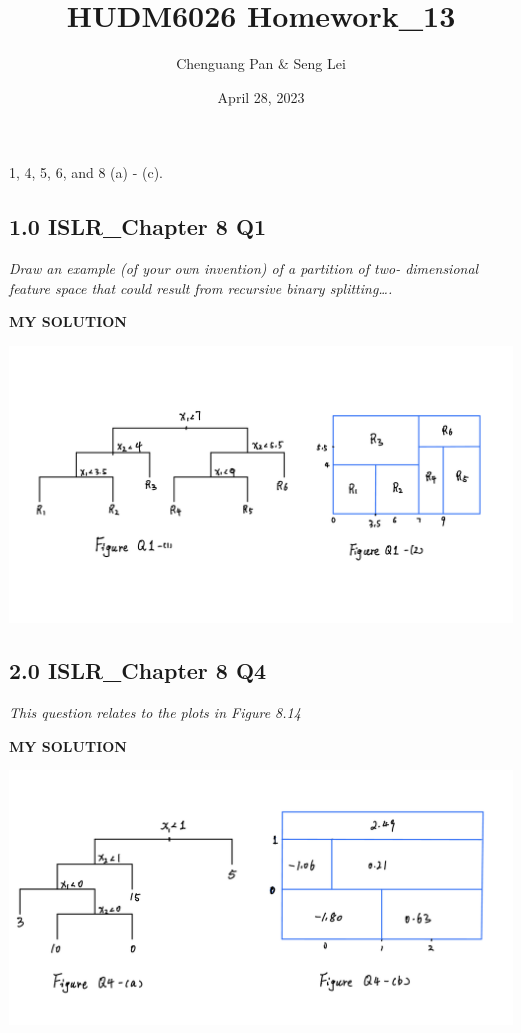 \documentclass[
]{article}
\title{HUDM6026 Homework\_13}
\author{Chenguang Pan \& Seng Lei}
\date{April 28, 2023}
\begin{document}
\maketitle

1, 4, 5, 6, and 8 (a) - (c).

\hypertarget{islr_chapter-8-q1}{%
\subsection{1.0 ISLR\_Chapter 8 Q1}\label{islr_chapter-8-q1}}

\emph{Draw an example (of your own invention) of a partition of two-
dimensional feature space that could result from recursive binary
splitting\ldots.}

\textbf{MY SOLUTION}

\includegraphics{images/Q1-Figures.jpeg}

\hypertarget{islr_chapter-8-q4}{%
\subsection{2.0 ISLR\_Chapter 8 Q4}\label{islr_chapter-8-q4}}

\emph{This question relates to the plots in Figure 8.14}

\textbf{MY SOLUTION}

\includegraphics{images/Q4-Figures.jpeg}
\end{document}
